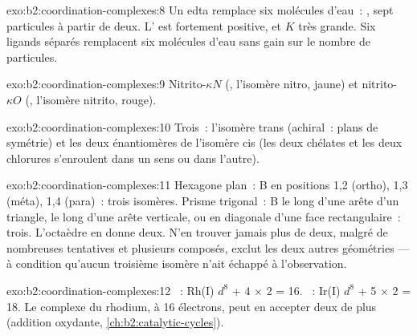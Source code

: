 \begin{solution}{exo:b2:coordination-complexes:8}
Un edta remplace six molécules d'eau~: , sept particules à partir de deux. L' est fortement positive, et
$K$ très grande. Six ligands séparés remplacent six molécules d'eau sans gain sur le
nombre de particules.
\end{solution}

\begin{solution}{exo:b2:coordination-complexes:9}
Nitrito-$\kappa N$ (, l'isomère nitro, jaune) et nitrito-$\kappa O$
(, l'isomère nitrito, rouge).
\end{solution}

\begin{solution}{exo:b2:coordination-complexes:10}
Trois~: l'isomère trans (achiral~: plans de symétrie) et les deux énantiomères de l'isomère
cis (les deux chélates et les deux chlorures s'enroulent dans un sens ou dans l'autre).
\end{solution}

\begin{solution}{exo:b2:coordination-complexes:11}
Hexagone plan~: B en positions 1,2 (ortho), 1,3 (méta), 1,4 (para)~: trois isomères.
Prisme trigonal~: B le long d'une arête d'un triangle, le long d'une arête verticale, ou en diagonale d'une
face rectangulaire~: trois. L'octaèdre en donne deux. N'en trouver jamais plus de deux, malgré
de nombreuses tentatives et plusieurs composés, exclut les deux autres géométries --- à condition qu'aucun
troisième isomère n'ait échappé à l'observation.
\end{solution}

\begin{solution}{exo:b2:coordination-complexes:12}
~: Rh(I) $d^8$ + 4 × 2 = 16. ~: Ir(I) $d^8$ + 5 × 2 =
18. Le complexe du rhodium, à 16 électrons, peut en accepter deux de plus (addition oxydante,
\cref{ch:b2:catalytic-cycles}).
\end{solution}

